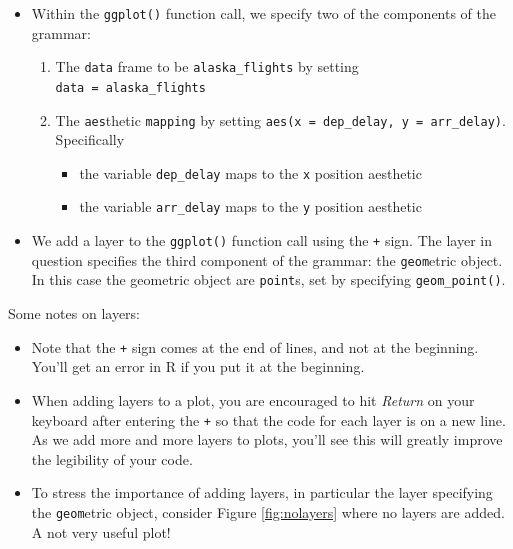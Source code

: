 \documentclass[12pt,]{krantz}
\providecommand{\tightlist}{%
  \setlength{\itemsep}{0pt}\setlength{\parskip}{0pt}}
\begin{document}
\begin{itemize}
\tightlist
\item
  Within the \texttt{ggplot()} function call, we specify two of the
  components of the grammar:

  \begin{enumerate}
  \def\labelenumi{\arabic{enumi}.}
  \tightlist
  \item
    The \texttt{data} frame to be \texttt{alaska\_flights} by setting
    \texttt{data\ =\ alaska\_flights}
  \item
    The \texttt{aes}thetic \texttt{mapping} by setting
    \texttt{aes(x\ =\ dep\_delay,\ y\ =\ arr\_delay)}. Specifically

    \begin{itemize}
    \tightlist
    \item
      the variable \texttt{dep\_delay} maps to the \texttt{x} position
      aesthetic
    \item
      the variable \texttt{arr\_delay} maps to the \texttt{y} position
      aesthetic
    \end{itemize}
  \end{enumerate}
\item
  We add a layer to the \texttt{ggplot()} function call using the
  \texttt{+} sign. The layer in question specifies the third component
  of the grammar: the \texttt{geom}etric object. In this case the
  geometric object are \texttt{point}s, set by specifying
  \texttt{geom\_point()}.
\end{itemize}

Some notes on layers:

\begin{itemize}
\tightlist
\item
  Note that the \texttt{+} sign comes at the end of lines, and not at
  the beginning. You'll get an error in R if you put it at the
  beginning.
\item
  When adding layers to a plot, you are encouraged to hit \emph{Return}
  on your keyboard after entering the \texttt{+} so that the code for
  each layer is on a new line. As we add more and more layers to plots,
  you'll see this will greatly improve the legibility of your code.
\item
  To stress the importance of adding layers, in particular the layer
  specifying the \texttt{geom}etric object, consider Figure
  \ref{fig:nolayers} where no layers are added. A not very useful plot!
\end{itemize}
\end{document}
